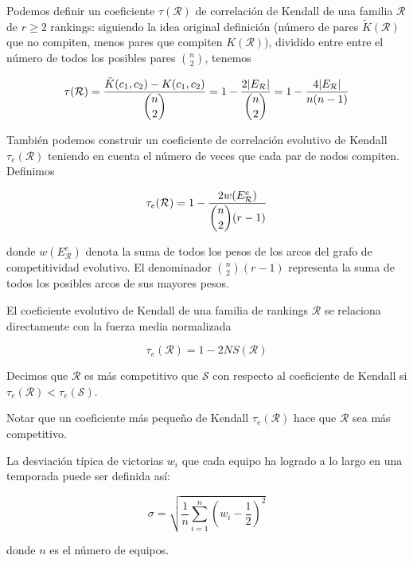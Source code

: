 \begin{defi}
Podemos definir un coeficiente $\tau(\mathcal{R})$ de correlación de Kendall de una familia $\mathcal{R}$ de $r \geq 2$ rankings: siguiendo la idea original definición (número de pares $\tilde{K}(\mathcal{R})$ que no compiten, menos pares que compiten $K(\mathcal{R})$), dividido entre entre el número de todos los posibles pares $\binom{n}{2}$, tenemos

\[ \tau(\mathcal{R}) = \dfrac{\tilde{K}(c_1,c_2) - K(c_1, c_2)}{\dbinom{n}{2}} = 1 - \dfrac{2 |E_\mathcal{R}|}{\dbinom{n}{2}} = 1 - \dfrac{4 |E_\mathcal{R}|}{n(n-1)} \]

También podemos construir un coeficiente de correlación evolutivo de Kendall $\tau_e(\mathcal{R})$ teniendo en cuenta el número de veces que cada par de nodos compiten. Definimos

\[ \tau_e(\mathcal{R}) = 1 - \dfrac{2w(E_\mathcal{R}^e)}{\dbinom{n}{2}(r-1)} \]

donde $w(E_\mathcal{R}^e)$ denota la suma de todos los pesos de los arcos del grafo de competitividad evolutivo. El denominador  $\binom{n}{2}(r-1)$ representa la suma de todos los posibles arcos de sus mayores pesos.
\end{defi}

\begin{nota}
El coeficiente evolutivo de Kendall de una familia de rankings $\mathcal{R}$ se relaciona directamente con la fuerza media normalizada

\[\tau_e(\mathcal{R}) = 1 - 2NS(\mathcal{R}) \]
\end{nota}

\begin{defi}
Decimos que $\mathcal{R}$ es más competitivo que $\mathcal{S}$ con respecto al coeficiente de Kendall si $\tau_e(\mathcal{R}) < \tau_e(\mathcal{S})$.
\end{defi}

\begin{nota}
Notar que un coeficiente más pequeño de Kendall $\tau_e(\mathcal{R})$ hace que $\mathcal{R}$ sea más competitivo.
\end{nota}

\begin{defi}
La desviación típica de victorias $w_i$ que cada equipo ha logrado a lo largo en una temporada puede ser definida así:

\[ \sigma = \sqrt{\dfrac{1}{n} \sum_{i=1}^{n}\left(w_i - \dfrac{1}{2}\right)^2 } \]

donde $n$ es el número de equipos.
\end{defi}

